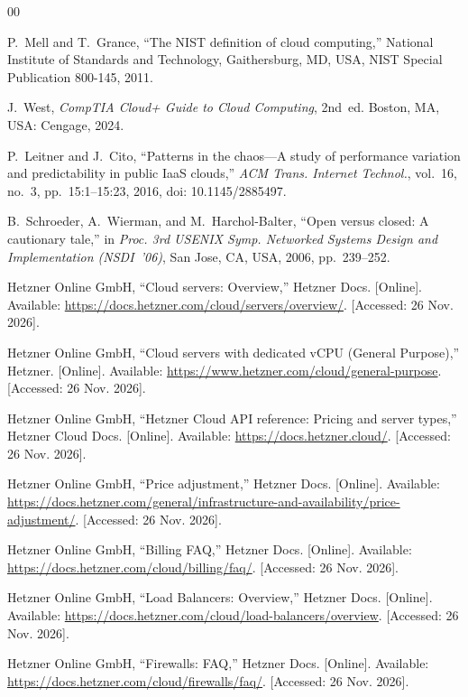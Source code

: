 \documentclass[conference,a4paper]{IEEEtran}
\begin{document}
\begin{thebibliography}{00}

 P.~Mell and T.~Grance, ``The NIST definition of cloud computing,'' National Institute of Standards and Technology, Gaithersburg, MD, USA, NIST Special Publication 800-145, 2011.

 J.~West, \textit{CompTIA Cloud+ Guide to Cloud Computing}, 2nd~ed. Boston, MA, USA: Cengage, 2024.

 P.~Leitner and J.~Cito, ``Patterns in the chaos---A study of performance variation and predictability in public IaaS clouds,'' \textit{ACM Trans. Internet Technol.}, vol.~16, no.~3, pp.~15:1--15:23, 2016, doi: 10.1145/2885497.

 B.~Schroeder, A.~Wierman, and M.~Harchol-Balter, ``Open versus closed: A cautionary tale,'' in \textit{Proc. 3rd USENIX Symp. Networked Systems Design and Implementation (NSDI~'06)}, San Jose, CA, USA, 2006, pp.~239--252.

 Hetzner Online GmbH, ``Cloud servers: Overview,'' Hetzner Docs. [Online]. Available: \url{https://docs.hetzner.com/cloud/servers/overview/}. [Accessed: 26 Nov. 2026].

 Hetzner Online GmbH, ``Cloud servers with dedicated vCPU (General Purpose),'' Hetzner. [Online]. Available: \url{https://www.hetzner.com/cloud/general-purpose}. [Accessed: 26 Nov. 2026].

 Hetzner Online GmbH, ``Hetzner Cloud API reference: Pricing and server types,'' Hetzner Cloud Docs. [Online]. Available: \url{https://docs.hetzner.cloud/}. [Accessed: 26 Nov. 2026].

 Hetzner Online GmbH, ``Price adjustment,'' Hetzner Docs. [Online]. Available: \url{https://docs.hetzner.com/general/infrastructure-and-availability/price-adjustment/}. [Accessed: 26 Nov. 2026].

 Hetzner Online GmbH, ``Billing FAQ,'' Hetzner Docs. [Online]. Available: \url{https://docs.hetzner.com/cloud/billing/faq/}. [Accessed: 26 Nov. 2026].

 Hetzner Online GmbH, ``Load Balancers: Overview,'' Hetzner Docs. [Online]. Available: \url{https://docs.hetzner.com/cloud/load-balancers/overview}. [Accessed: 26 Nov. 2026].

 Hetzner Online GmbH, ``Firewalls: FAQ,'' Hetzner Docs. [Online]. Available: \url{https://docs.hetzner.com/cloud/firewalls/faq/}. [Accessed: 26 Nov. 2026].


\end{thebibliography}
\end{document}
